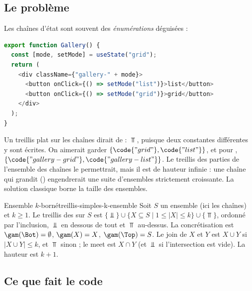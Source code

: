 \subsection{Le problème}

Les chaînes d'état sont souvent des \emph{énumérations} déguisées :

\begin{lstlisting}[language=TypeScript,caption={Un mode d'affichage (exemple d'illustration)},label={lst:treillis-simples-mode}]
export function Gallery() {
  const [mode, setMode] = useState("grid");
  return (
    <div className={"gallery-" + mode}>
      <button onClick={() => setMode("list")}>list</button>
      <button onClick={() => setMode("grid")}>grid</button>
    </div>
  );
}
\end{lstlisting}

Un treillis plat sur les chaînes dirait de  : $\Top$, puisque deux
constantes différentes y sont écrites. On aimerait garder
$\{\code{"grid"}, \code{"list"}\}$, et pour ,
$\{\code{"gallery-grid"}, \code{"gallery-list"}\}$. Le treillis des parties de
l'ensemble des chaînes le permettrait, mais il est de hauteur infinie : une
chaîne qui grandit () engendrerait une suite d'ensembles
strictement croissante. La solution classique borne la taille des ensembles.

\begin{definition}{Ensemble $k$-borné}{treillis-simples-k-ensemble}
  Soit $S$ un ensemble (ici les chaînes) et $k \ge 1$. Le treillis des
   sur $S$ est
  $\{\Bot\} \cup \{X \subseteq S \mid 1 \le |X| \le k\} \cup \{\Top\}$,
  ordonné par l'inclusion, $\Bot$ en dessous de tout et $\Top$ au-dessus. La
  concrétisation est $\gam(\Bot) = \emptyset$, $\gam(X) = X$,
  $\gam(\Top) = S$. Le join de $X$ et $Y$ est $X \cup Y$ si
  $|X \cup Y| \le k$, et $\Top$ sinon ; le meet est $X \cap Y$ (et $\Bot$ si
  l'intersection est vide). La hauteur est $k + 1$.
\end{definition}

\subsection{Ce que fait le code}


